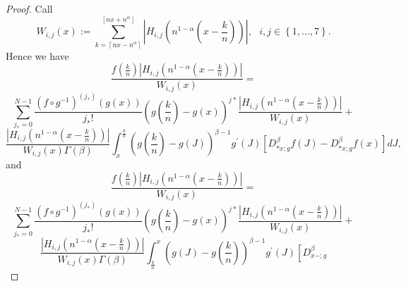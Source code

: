 \documentclass[10pt]{NSP1}
\numberwithin{equation}{section}
\begin{document}
\begin{proof}
Call
\begin{equation*}
W_{i,j}\left( x\right) :=\sum \limits_{k=\left \lceil nx-n^{\alpha }\right
\rceil }^{\left[ nx+n^{\alpha }\right] }\left \vert H_{i,j}\left(
n^{1-\alpha }\left( x-\frac{k}{n}\right) \right) \right \vert ,\text{ \ }%
i,j\in \left \{ 1,...,7\right \} .
\end{equation*}
Hence we have
\begin{equation*}
\frac{f\left( \frac{k}{n}\right) \left \vert H_{i,j}\left( n^{1-\alpha
}\left( x-\frac{k}{n}\right) \right) \right \vert }{W_{i,j}\left( x\right) }=
\end{equation*}
\begin{equation}
\sum_{j_{\ast }=0}^{N-1}\frac{\left( f\circ g^{-1}\right) ^{\left( j_{\ast
}\right) }\left( g\left( x\right) \right) }{j_{\ast }!}\left( g\left( \frac{k%
}{n}\right) -g\left( x\right) \right) ^{j\ast }\frac{\left \vert
H_{i,j}\left( n^{1-\alpha }\left( x-\frac{k}{n}\right) \right) \right \vert
}{W_{i,j}\left( x\right) }+  \tag{28}  \label{28}
\end{equation}
\begin{equation*}
\frac{\left \vert H_{i,j}\left( n^{1-\alpha }\left( x-\frac{k}{n}\right)
\right) \right \vert }{W_{i,j}\left( x\right) \Gamma \left( \beta \right) }%
\int_{x}^{\frac{k}{n}}\left( g\left( \frac{k}{n}\right) -g\left( J\right)
\right) ^{\beta -1}g^{\prime }\left( J\right) \left[ D_{\ast x;g}^{\beta
}f\left( J\right) -D_{\ast x;g}^{\beta }f\left( x\right) \right] dJ,
\end{equation*}
and
\begin{equation*}
\frac{f\left( \frac{k}{n}\right) \left \vert H_{i,j}\left( n^{1-\alpha
}\left( x-\frac{k}{n}\right) \right) \right \vert }{W_{i,j}\left( x\right) }=
\end{equation*}
\begin{equation}
\sum_{j_{\ast }=0}^{N-1}\frac{\left( f\circ g^{-1}\right) ^{\left( j_{\ast
}\right) }\left( g\left( x\right) \right) }{j_{\ast }!}\left( g\left( \frac{k%
}{n}\right) -g\left( x\right) \right) ^{j\ast }\frac{\left \vert
H_{i,j}\left( n^{1-\alpha }\left( x-\frac{k}{n}\right) \right) \right \vert
}{W_{i,j}\left( x\right) }+  \tag{29}  \label{29}
\end{equation}
\begin{equation*}
\frac{\left \vert H_{i,j}\left( n^{1-\alpha }\left( x-\frac{k}{n}\right)
\right) \right \vert }{W_{i,j}\left( x\right) \Gamma \left( \beta \right) }%
\int_{\frac{k}{n}}^{x}\left( g\left( J\right) -g\left( \frac{k}{n}\right)
\right) ^{\beta -1}g^{\prime }\left( J\right) \left[ D_{x-;g}^{\beta
}
\end{equation*}
\end{proof}
\end{document}

